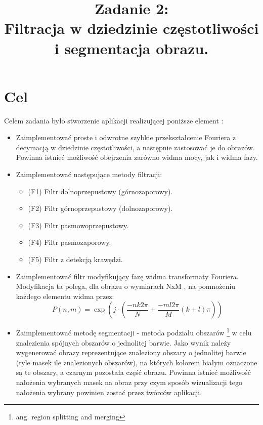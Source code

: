 \documentclass{classrep}
\author{
  \studentinfo{Paweł Musiał}{178726} \and
  \studentinfo{Łukasz Michalski}{178724}
}
\title{Zadanie 2:\\  \textbf {Filtracja w dziedzinie częstotliwości i segmentacja obrazu.}}
\begin{document}
\maketitle

\addtocounter{footnote}{1}

\tableofcontents

\section{Cel}

Celem zadania było stworzenie aplikacji realizującej poniższe element :
\begin{itemize}
\renewcommand{\labelitemi}{$\bullet$}
\item Zaimplementować proste i odwrotne szybkie przekształcenie Fouriera z decymacją w dziedzinie częstotliwości, a następnie zastosować je do obrazów. Powinna istnieć możliwość obejrzenia zarówno widma mocy, jak i widma fazy.
\item Zaimplementować następujące metody filtracji:
\begin{itemize}
\item (F1) Filtr dolnoprzepustowy (górnozaporowy).
\item (F2) Filtr górnoprzepustowy (dolnozaporowy).
\item (F3) Filtr pasmowoprzepustowy.
\item (F4) Filtr pasmozaporowy.
\item (F5) Filtr z detekcją krawędzi.
\end{itemize}
\item Zaimplementować filtr modyfikujący fazę widma transformaty Fouriera. Modyfikacja ta polega, dla obrazu o wymiarach NxM , na pomnożeniu każdego elementu widma przez:
\begin{equation*}
P(n,m) = \exp \left( j \cdot \left( \frac{-n k 2 \pi}{N} + \frac{-m l 2 \pi }{M} \left( k + l  \right) \pi \right)\right)
\end{equation*}
\item Zaimplementować metodę segmentacji - metoda podziału obszarów \footnote{ang. region splitting and merging}  w celu znalezienia spójnych obszarów o jednolitej barwie. Jako wynik należy wygenerować obrazy reprezentujące znaleziony obszary o jednolitej barwie (tyle masek ile znalezionych obszarów), na których kolorem białym oznaczone są te obszary, a czarnym pozostała część obrazu. Powinna istnieć możliwość nałożenia wybranych masek na obraz przy czym sposób wizualizacji tego nałożenia wybrany powinien zostać przez twórców aplikacji.
\end{itemize}
\end{document}
